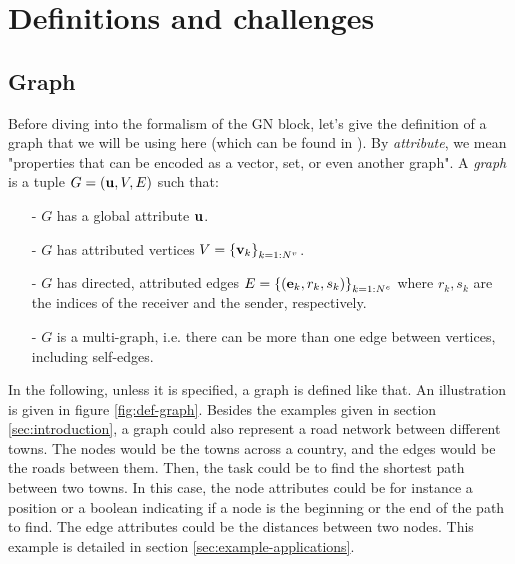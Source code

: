 \documentclass{article}
\begin{document}
\section{Definitions and challenges}
\label{sec:def-challenges}

    \subsection{Graph}
    \label{subsec:def-graph}

Before diving into the formalism of the GN block, let's give the definition of a graph that we will be using here (which can be found in \cite{battaglia2018relational}). By \emph{attribute}, we mean "properties that can be encoded as a vector, set, or even another graph". A \emph{graph} is a tuple $G = \left( \mathbf{u}, V, E \right)$ such that:

\begin{itemize}
    \item[-] $G$ has a global attribute $\mathbf{u}$.
    
    \item[-] $G$ has attributed vertices $V = \left\{ \mathbf{v}_k \right\}_{k=1:N^v}$.
    
    \item[-] $G$ has directed, attributed edges $E = \left\{ \left( \mathbf{e}_k, r_k, s_k \right) \right\}_{k=1:N^e}$ where $r_k, s_k$ are the indices of the receiver and the sender, respectively.
    
    \item[-] $G$ is a multi-graph, i.e. there can be more than one edge between vertices, including self-edges.
\end{itemize}

In the following, unless it is specified, a graph is defined like that. An illustration is given in figure \ref{fig:def-graph}. Besides the examples given in section \ref{sec:introduction}, a graph could also represent a road network between different towns. The nodes would be the towns across a country, and the edges would be the roads between them. Then, the task could be to find the shortest path between two towns. In this case, the node attributes could be for instance a position or a boolean indicating if a node is the beginning or the end of the path to find. The edge attributes could be the distances between two nodes. This example is detailed in section \ref{sec:example-applications}.
\end{document}
